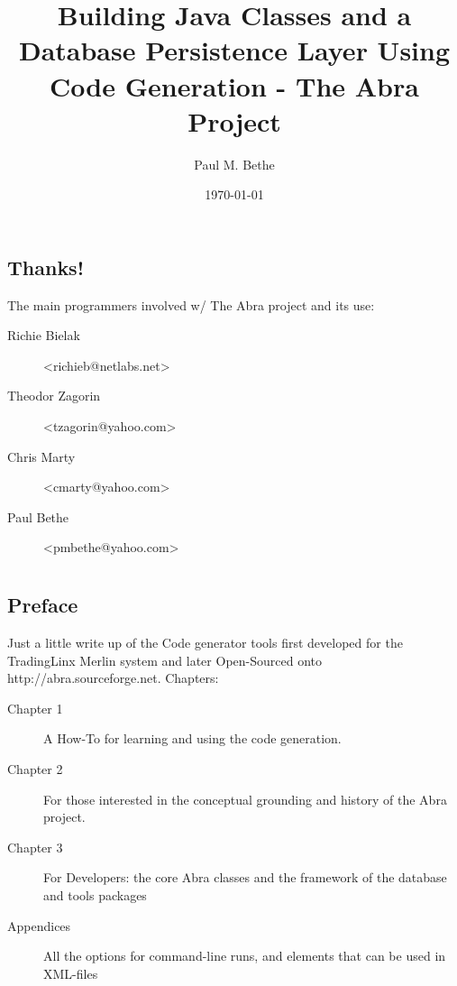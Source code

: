\documentclass[10pt,openany]{book}
\title{Building Java Classes and a Database Persistence Layer Using
Code Generation - The Abra Project}
\author{Paul M. Bethe}
\date{\today}
\begin{document}
\frontmatter
\maketitle
\chapter[Acknowledgments]{}
\section*{Thanks!}
The main programmers involved w/ The Abra project and its use:
\begin{description}
\item[Richie Bielak] \textless richieb@netlabs.net\textgreater
\item[Theodor Zagorin] \textless tzagorin@yahoo.com\textgreater
\item[Chris Marty] \textless cmarty@yahoo.com\textgreater
\item[Paul Bethe] \textless pmbethe@yahoo.com\textgreater
\end{description}

\chapter[Preface]{}
\section*{Preface}
Just a little write up of the Code generator tools first developed for the
TradingLinx Merlin system and later Open-Sourced onto
http://abra.sourceforge.net.  Chapters: 
\begin{description}
\item[Chapter 1] A How-To for learning and using the code generation.

\item[Chapter 2] For those interested in the conceptual grounding and
history of the Abra project.

\item[Chapter 3] For Developers: the core Abra classes and the
framework of the database and tools packages 

\item[Appendices] All the options for command-line runs, and elements
that can be used in XML-files 
\end{description} 

\nopagebreak
\tableofcontents

\mainmatter
\end{document}
